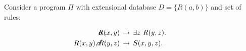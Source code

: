 \documentclass[format=acmsmall, review=false, screen=true]{acmart}
\newcommand{\boxtheorem}{\ensuremath{\hfill \Box}}
\newcommand{\nit}[1]{{\it #1}}
\newcommand{\myrightarrow}[1]{\xrightarrow{~#1~}}
\begin{document}
{{%






\begin{example} \label{ex:chase} Consider a program $\Pi$ with extensional database $D=\{R(a,b)\}$ and set of rules:

\vspace{-6mm}
\begin{align*}
\sigma&:&\hspace{-2cm}R(x,y) \! ~&\rightarrow~ \! \exists z \ R(y,z).\\
\sigma'&:&\hspace{-2cm}R(x,y),R(y,z) \! ~&\rightarrow~ \! S(x,y,z).
\end{align*}
\vspace{-3mm}


\end{example}}}
\end{document}
